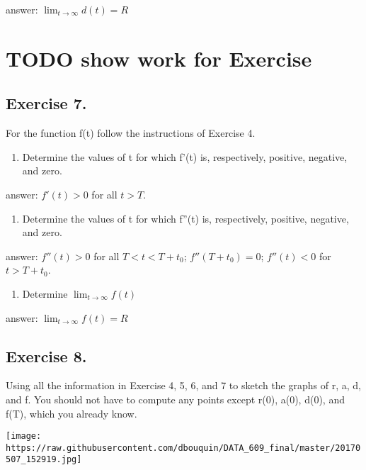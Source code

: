 \documentclass[]{article}
\providecommand{\tightlist}{%
  \setlength{\itemsep}{0pt}\setlength{\parskip}{0pt}}
\begin{document}
answer: \(\lim_{t\to\infty}d(t) =R\)

\section{TODO show work for
Exercise}\label{todo-show-work-for-exercise-1}

\subsection{Exercise 7.}\label{exercise-7.}

For the function f(t) follow the instructions of Exercise 4.

\begin{enumerate}
\def\labelenumi{(\alph{enumi})}
\tightlist
\item
  Determine the values of t for which f'(t) is, respectively, positive,
  negative, and zero.
\end{enumerate}

answer: \(f'(t) > 0\) for all \(t > T\).

\begin{enumerate}
\def\labelenumi{(\alph{enumi})}
\setcounter{enumi}{1}
\tightlist
\item
  Determine the values of t for which f''(t) is, respectively, positive,
  negative, and zero.
\end{enumerate}

answer: \(f''(t) > 0\) for all \(T < t < T + t_0\); \(f''(T + t_0) =0\);
\(f''(t) < 0\) for \(t > T + t_0\).

\begin{enumerate}
\def\labelenumi{(\alph{enumi})}
\setcounter{enumi}{2}
\tightlist
\item
  Determine \(\lim_{t\to\infty}f(t)\)
\end{enumerate}

answer: \(\lim_{t\to\infty}f(t) =R\)

\subsection{Exercise 8.}\label{exercise-8.}

Using all the information in Exercise 4, 5, 6, and 7 to sketch the
graphs of r, a, d, and f. You should not have to compute any points
except r(0), a(0), d(0), and f(T), which you already know.

\texttt{[image: https://raw.githubusercontent.com/dbouquin/DATA\_609\_final/master/20170507\_152919.jpg]}
\newpage
\end{document}
